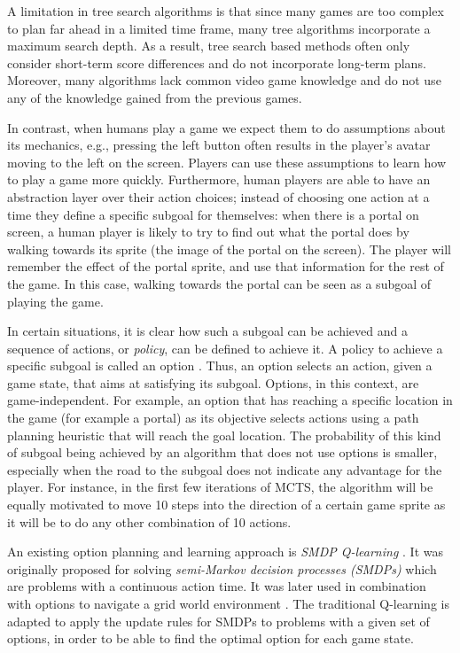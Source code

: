 A limitation in tree search algorithms is that since many games are too complex
to plan far ahead in a limited time frame, many tree algorithms incorporate a
maximum search depth. As a result, tree search based methods often only
consider short-term score differences and do not incorporate long-term
plans. Moreover, many algorithms lack common video game knowledge and do not
use any of the knowledge gained from the previous games.

In contrast, when humans play a game we expect them to do assumptions about its
mechanics, e.g., pressing the left button often results in the player's avatar
moving to the left on the screen. Players can use these assumptions to learn how
to play a game more quickly. Furthermore, human players are able to have an
abstraction layer over their action choices; instead of choosing one action at a
time they define a specific subgoal for themselves: when there is a portal on
screen, a human player is likely to try to find out what the portal does by
walking towards its sprite (the image of the portal on the screen). The player
will remember the effect of the portal sprite, and use that information for the
rest of the game. In this case, walking towards the portal can be seen as a
subgoal of playing the game.

In certain situations, it is clear how such a subgoal can be achieved and a
sequence of actions, or \emph{policy}, can be defined to achieve it. A policy to
achieve a specific subgoal is called an option \cite{sutton1999between}. Thus, an option selects an
action, given a game state, that aims at satisfying its subgoal. Options, in
this context, are game-independent. For example, an option that has reaching a
specific location in the game (for example a portal) as its objective selects
actions using a path planning heuristic that will reach the goal location. 
The probability of this kind of subgoal being achieved by an algorithm that
does not use options is smaller, especially when the road to the subgoal does
not indicate any advantage for the player. For instance, in the first few
iterations of MCTS, the algorithm will be equally motivated to move 10 steps
into the direction of a certain game sprite as it will be to do any other
combination of 10 actions. 

An existing option planning and learning approach is \emph{SMDP Q-learning}
\cite{duff1995reinforcement}. It was originally proposed for solving
\emph{semi-Markov decision processes (SMDPs)} which are problems with a
continuous action time. It was later used in combination with options to
navigate a grid world environment \cite{sutton1999between, stolle2002learning}.
The traditional Q-learning is adapted to apply the update rules for SMDPs to
problems with a given set of options, in order to be able to find the optimal
option for each game state. 

